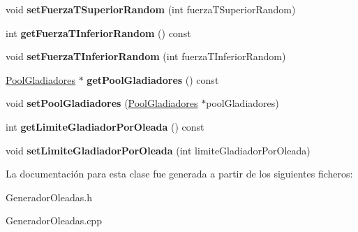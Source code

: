\begin{DoxyCompactItemize}
\mbox{\label{classGeneradorOleadas_a488ea386d62eeb91fd4a5b31a05f875d}} 
void {\bfseries set\+Fuerza\+T\+Superior\+Random} (int fuerza\+T\+Superior\+Random)
\item 
\mbox{\label{classGeneradorOleadas_a9370cc5cf60486413b7423dd793967a2}} 
int {\bfseries get\+Fuerza\+T\+Inferior\+Random} () const
\item 
\mbox{\label{classGeneradorOleadas_accae279076dc1c24c9623d6a0b763276}} 
void {\bfseries set\+Fuerza\+T\+Inferior\+Random} (int fuerza\+T\+Inferior\+Random)
\item 
\mbox{\label{classGeneradorOleadas_a9e62beeeb4d20b4a7a1b4d1375aada25}} 
\hyperlink{classPoolGladiadores}{Pool\+Gladiadores} $\ast$ {\bfseries get\+Pool\+Gladiadores} () const
\item 
\mbox{\label{classGeneradorOleadas_a6d0d3363e9e1c903af8b247c9428078b}} 
void {\bfseries set\+Pool\+Gladiadores} (\hyperlink{classPoolGladiadores}{Pool\+Gladiadores} $\ast$pool\+Gladiadores)
\item 
\mbox{\label{classGeneradorOleadas_a97a29b214aa5dd4a9a9071d8297bf179}} 
int {\bfseries get\+Limite\+Gladiador\+Por\+Oleada} () const
\item 
\mbox{\label{classGeneradorOleadas_a5794f12d98d01d0559809b34710b044f}} 
void {\bfseries set\+Limite\+Gladiador\+Por\+Oleada} (int limite\+Gladiador\+Por\+Oleada)
\end{DoxyCompactItemize}


La documentación para esta clase fue generada a partir de los siguientes ficheros\+:\begin{DoxyCompactItemize}
\item 
Generador\+Oleadas.\+h\item 
Generador\+Oleadas.\+cpp\end{DoxyCompactItemize}
